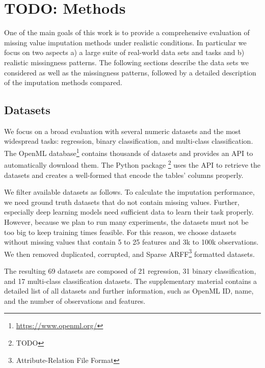 
\section{TODO: Methods}
%
One of the main goals of this work is to provide a comprehensive evaluation of missing value imputation methods under realistic conditions. In particular we focus on two aspects a) a large suite of real-world data sets and tasks and b) realistic missingness patterns. The following sections describe the data sets we considered as well as the missingness patterns, followed by a detailed description of the imputation methods compared.

\subsection{Datasets}
%
We focus on a broad evaluation with several numeric datasets and the most widespread tasks: regression, binary classification, and multi-class classification. The OpenML database\footnote{\url{https://www.openml.org/}} contains thousands of datasets and provides an API to automatically download them. The Python package \footnote{TODO} uses the API to retrieve the datasets and creates a well-formed  that encode the tables' columns properly.

We filter available datasets as follows. To calculate the imputation performance, we need ground truth datasets that do not contain missing values. Further, especially deep learning models need sufficient data to learn their task properly. However, because we plan to run many experiments, the datasets must not be too big to keep training times feasible. For this reason, we choose datasets without missing values that contain 5 to 25 features and 3k to 100k observations. We then removed duplicated, corrupted, and Sparse ARFF\footnote{Attribute-Relation File Format} formatted datasets.

The resulting 69 datasets are composed of 21 regression, 31 binary classification, and 17 multi-class classification datasets. The supplementary material contains a detailed list of all datasets and further information, such as OpenML ID, name, and the number of observations and features.


